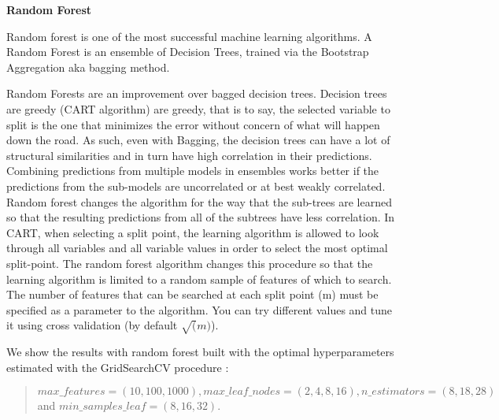 \documentclass[11pt]{article}
\theoremstyle{definition}
\theoremstyle{remark}
\begin{document}
{\textbf{Random Forest}

Random forest is one of the most successful machine learning algorithms. A Random Forest is an ensemble of Decision Trees, trained via the  Bootstrap Aggregation aka bagging method. 

Random Forests are an improvement over bagged decision trees. Decision trees are greedy (CART algorithm) are greedy, that is to say, the selected variable to split is the one that minimizes the error without concern of what will happen down the road. As such, even with Bagging, the decision trees can have a lot of structural similarities and in turn have high correlation in their predictions. Combining predictions from multiple models in ensembles works better if the predictions from the sub-models are uncorrelated or at best weakly correlated.
Random forest changes the algorithm for the way that the sub-trees are learned so that the resulting predictions from all of the subtrees have less correlation. In CART, when selecting a split point, the learning algorithm is allowed to look through all variables and all variable values in order to select the most optimal split-point. The random forest algorithm changes this procedure so that the learning algorithm is limited to a random sample of features of which to search. The number of features that can be searched at each split point (m) must be specified as a parameter to the algorithm. You can try different values and tune it using cross validation (by default $\sqrt(m)$).

We show the results with random forest built with the optimal hyperparameters estimated with the GridSearchCV procedure
: 
\begin{quote}
$max\_features=(10,100,1000), max\_leaf\_nodes=(2,4,8,16), n\_estimators=(8,18,28)$ and  $min\_samples\_leaf=(8,16,32)$.
\end{quote}

}
\end{document}
